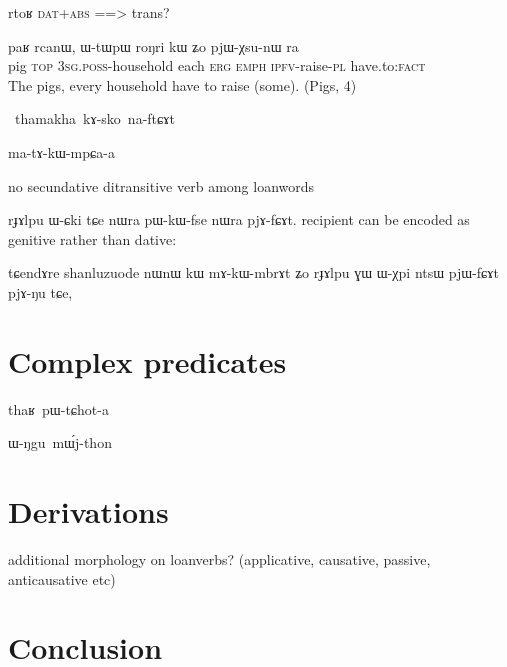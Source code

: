 \documentclass[oldfontcommands,oneside,a4paper,11pt]{article}
\newcommand{\ipa}[1]{{\phon \mbox{#1}}} %
\begin{document}
  \ipa{rtoʁ} \textsc{dat+abs} ==> trans?

\begin{exe}
\ex
\gll  
	\ipa{paʁ}  	\ipa{rcanɯ,}  	\ipa{ɯ-tɯpɯ}  	\ipa{roŋri}  	\ipa{kɯ}  	\ipa{ʑo}  	\ipa{pjɯ-χsu-nɯ}  	\ipa{ra}  \\
	pig \textsc{top} \textsc{3sg.poss}-household each \textsc{erg} \textsc{emph} \textsc{ipfv}-raise-\textsc{pl} have.to:\textsc{fact} \\
	\glt The pigs, every household have to raise (some). (Pigs, 4)
\end{exe}
  
\ipa{  thamakha kɤ-sko na-ftɕɤt}
  
  \ipa{ma-tɤ-kɯ-mpɕa-a}
  
  
  no secundative ditransitive verb among loanwords

  rɟɤlpu ɯ-ɕki tɕe nɯra pɯ-kɯ-fse nɯra pjɤ-fɕɤt.
recipient can be encoded as genitive rather than dative:  

  tɕendɤre shanluzuode nɯnɯ kɯ mɤ-kɯ-mbrɤt ʑo rɟɤlpu ɣɯ ɯ-χpi ntsɯ pjɯ-fɕɤt pjɤ-ŋu tɕe,
  \section{Complex predicates}  
  \ipa{thaʁ pɯ-tɕhot-a}
  
  \ipa{ɯ-ŋgu mɯ́j-thon}
  \section{Derivations}
additional morphology on loanverbs? (applicative, causative, passive, anticausative etc)  
  
%
%
%
%
%
%
% 
%
%
%
%
% 
%
%
%
%
%
% 

  \section{Conclusion}
  


\end{document}
